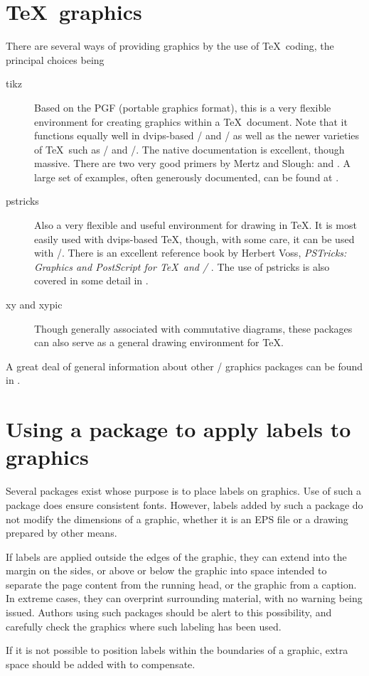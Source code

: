 \section{\TeX\ graphics}

There are several ways of providing graphics by the use of \TeX\ coding,
the principal choices being

\begin{description}
\item[tikz]Based on the PGF (portable graphics format), this is a very
 flexible environment for creating graphics within a \TeX\ document. Note
 that it functions equally well in dvips-based \latex/ and \pdfLaTeX/ as
 well as the newer varieties of \TeX\ such as \XeLaTeX/ and \LuaLaTeX/.
 The native documentation \cite{tkz} is excellent, though massive. There
 are two very good primers by Mertz and Slough: \cite{MeSlp} and
 \cite{MeSlt}. A large set of examples, often generously documented, can be
 found at \cite{tkz-ex}.
\item[pstricks]Also a very flexible and useful environment for drawing in
 \TeX. It is most easily used with dvips-based \TeX, though, with some
 care, it can be used with \pdfLaTeX/. There is an excellent reference
 book by Herbert Voss, \emph{PSTricks: Graphics and PostScript for \TeX\
 and \latex/} \cite{voss-pst}. The use of pstricks is also covered in some
 detail in \cite[chapters five and six]{GM}.
\item[xy and xypic]Though generally associated with commutative diagrams,
 these packages can also serve as a general drawing environment for \TeX.
\end{description}
\noindent A great deal of general information about other \latex/ graphics
packages can be found in \cite{GM}.

\section{Using a package to apply labels to graphics}

Several packages exist whose purpose is to place labels on graphics.
Use of such a package does ensure consistent fonts.  However, labels
added by such a package do not modify the dimensions of a graphic,
whether it is an EPS file or a drawing prepared by other means.

If labels are applied outside the edges of the graphic, they can
extend into the margin on the sides, or above or below the graphic
into space intended to separate the page content from the running head,
or the graphic from a caption.  In extreme cases, they can overprint
surrounding material, with no warning being issued.  Authors using
such packages should be alert to this possibility, and carefully check
the graphics where such labeling has been used.

If it is not possible to position labels within the boundaries of a
graphic, extra space should be added with \cn{vspace} to compensate.

\endinput
